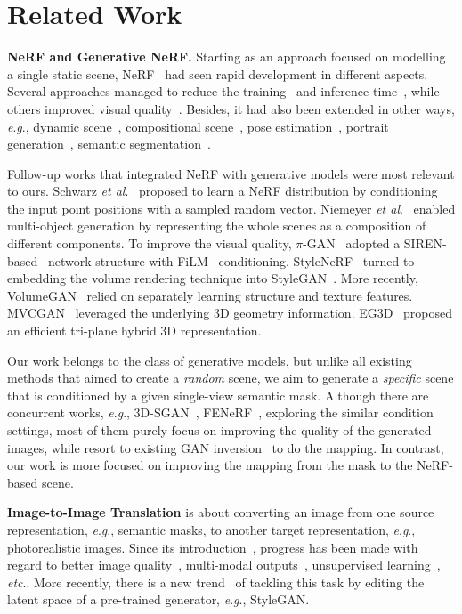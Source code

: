 \documentclass[runningheads]{llncs}
\newcommand{\etal}{\textit{et al}.}
\newcommand{\eg}{\textit{e}.\textit{g}.}
\newcommand{\etc}{\textit{etc}.}
\begin{document}
\section{Related Work}

\textbf{NeRF and Generative NeRF.}
Starting as an approach focused on modelling a single static scene, NeRF~\cite{mildenhall2020nerf} had seen rapid development in different aspects. Several approaches managed to reduce the training~\cite{sun2021direct} and inference time~\cite{liu2020neural,lombardi2021mixture}, while others improved visual quality~\cite{barron2021mip}. Besides, it had also been extended in other ways, \eg, dynamic scene~\cite{pumarola2021d}, compositional scene~\cite{wu2022objectsdf}, pose estimation~\cite{yen2021inerf}, portrait generation~\cite{liu2022semantic}, semantic segmentation~\cite{zhi2021place}. 

Follow-up works that integrated NeRF with generative models were most relevant to ours. Schwarz \etal~\cite{schwarz2020graf} proposed to learn a NeRF distribution by conditioning the input point positions with a sampled random vector.
Niemeyer \etal~\cite{niemeyer2021giraffe} enabled multi-object generation by representing the whole scenes as a composition of different components. To improve the visual quality, $\pi$-GAN~\cite{chan2021pi} adopted a SIREN-based~\cite{sitzmann2020implicit} network structure with FiLM~\cite{perez2018film} conditioning. StyleNeRF~\cite{gu2021stylenerf} turned to embedding the volume rendering technique into StyleGAN~\cite{karras2020analyzing}. 
More recently, VolumeGAN~\cite{xu20213d} relied on separately learning structure and texture features. MVCGAN~\cite{zhang2022multi} leveraged the underlying 3D geometry information. EG3D~\cite{chan2021efficient} proposed an efficient tri-plane hybrid 3D representation.

Our work belongs to the class of generative models, but unlike all existing methods that aimed to create a \emph{random} scene, we aim to generate a \emph{specific} scene that is conditioned by a given single-view semantic mask. Although there are concurrent works, \eg, 3D-SGAN~\cite{zhang20213d}, FENeRF~\cite{sun2022fenerf}, exploring the similar condition settings, most of them purely focus on improving the quality of the generated images, while resort to existing GAN inversion~\cite{karras2020analyzing} to do the mapping. In contrast, our work is more focused on improving the mapping from the mask to the NeRF-based scene.


\noindent\textbf{Image-to-Image Translation} is about converting an image from one source representation, \eg, semantic masks, to another target representation, \eg, photorealistic images. Since its introduction~\cite{isola2017image}, progress has been made with regard to better image quality~\cite{wang2018high,chen2021edge}, multi-modal outputs~\cite{zhu2017toward,zheng2019pluralistic,choi2020stargan}, unsupervised learning~\cite{zhu2017unpaired,lira2020ganhopper}, \etc.  More recently,
there is a new trend~\cite{richardson2021encoding,shi2022semanticstylegan,xu2022transeditor} of tackling this task by editing the latent space of a pre-trained generator, \eg, StyleGAN.
\end{document}

